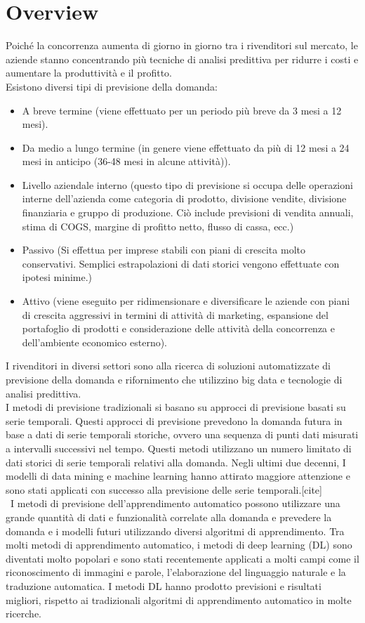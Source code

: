 \documentclass[12pt,a4paper]{report}
\begin{document}
\section{Overview}
Poiché la concorrenza aumenta di giorno in giorno tra i rivenditori sul mercato, le aziende stanno concentrando più tecniche di analisi predittiva per ridurre i costi e aumentare la produttività e il profitto.\\
Esistono diversi tipi di previsione della domanda: \cite{towards:demandForecast}
\begin{itemize}
    \item A breve termine (viene effettuato per un periodo più breve da 3 mesi a 12 mesi). 
    \item Da medio a lungo termine (in genere viene effettuato da più di 12 mesi a 24 mesi in anticipo (36-48 mesi in alcune attività)).
    \item Livello aziendale interno (questo tipo di previsione si occupa delle operazioni interne dell'azienda come categoria di prodotto, divisione vendite, divisione finanziaria e gruppo di produzione. Ciò include previsioni di vendita annuali, stima di COGS, margine di profitto netto, flusso di cassa, ecc.)
    \item Passivo (Si effettua per imprese stabili con piani di crescita molto conservativi. Semplici estrapolazioni di dati storici vengono effettuate con ipotesi minime.)
    \item Attivo (viene eseguito per ridimensionare e diversificare le aziende con piani di crescita aggressivi in termini di attività di marketing, espansione del portafoglio di prodotti e considerazione delle attività della concorrenza e dell'ambiente economico esterno).
\end{itemize}

I rivenditori in diversi settori sono alla ricerca di soluzioni automatizzate di previsione della domanda e rifornimento che utilizzino big data e tecnologie di analisi predittiva. \\
I metodi di previsione tradizionali si basano su approcci di previsione basati su serie temporali. Questi approcci di previsione prevedono la domanda futura in base a dati di serie temporali storiche, ovvero una sequenza di punti dati misurati a intervalli successivi nel tempo. Questi metodi utilizzano un numero limitato di dati storici di serie temporali relativi alla domanda. Negli ultimi due decenni, I modelli di data mining e machine learning hanno attirato maggiore attenzione e sono stati applicati con successo alla previsione delle serie temporali.[cite]\\\
I metodi di previsione dell'apprendimento automatico possono utilizzare una grande quantità di dati e funzionalità correlate alla domanda e prevedere la domanda e i modelli futuri utilizzando diversi algoritmi di apprendimento. Tra molti metodi di apprendimento automatico, i metodi di deep learning (DL) sono diventati molto popolari e sono stati recentemente applicati a molti campi come il riconoscimento di immagini e parole, l'elaborazione del linguaggio naturale e la traduzione automatica.
I metodi DL hanno prodotto previsioni e risultati migliori, rispetto ai tradizionali algoritmi di apprendimento automatico in molte ricerche. 
\end{document}
